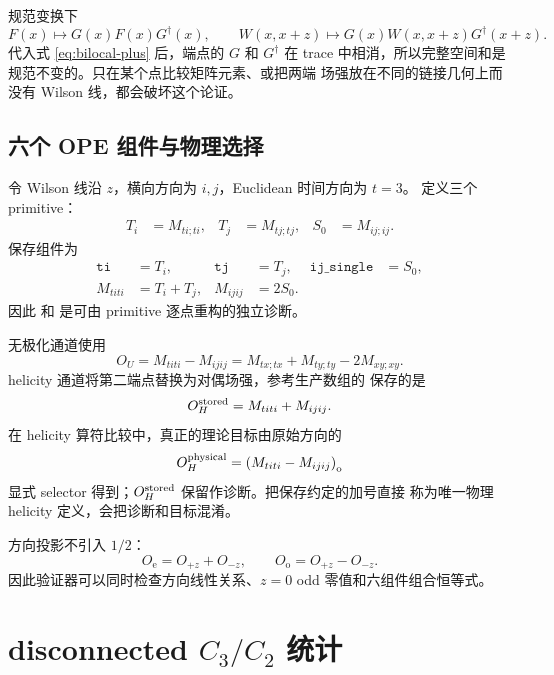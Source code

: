 \documentclass[UTF8,a4paper,11pt]{ctexart}
\newcommand{\code}[1]{\texttt{\detokenize{#1}}}
\newcommand{\odd}{\mathrm{o}}
\newcommand{\even}{\mathrm{e}}
\begin{document}
规范变换下
\begin{equation}
 F(x)\mapsto G(x)F(x)G^\dagger(x),\qquad
 W(x,x+z)\mapsto G(x)W(x,x+z)G^\dagger(x+z).
\label{eq:gauge-transform}
\end{equation}
代入式 \eqref{eq:bilocal-plus} 后，端点的 $G$ 和 $G^\dagger$ 在 trace
中相消，所以完整空间和是规范不变的。只在某个点比较矩阵元素、或把两端
场强放在不同的链接几何上而没有 Wilson 线，都会破坏这个论证。

\subsection{六个 OPE 组件与物理选择}

令 Wilson 线沿 $z$，横向方向为 $i,j$，Euclidean 时间方向为 $t=3$。
定义三个 primitive：
\begin{align}
 T_i&=M_{ti;ti},&
 T_j&=M_{tj;tj},&
 S_0&=M_{ij;ij}.
\end{align}
保存组件为
\begin{align}
 \texttt{ti}&=T_i,&
 \texttt{tj}&=T_j,&
 \texttt{ij\_single}&=S_0,\\
 M_{titi}&=T_i+T_j,&
 M_{ijij}&=2S_0.
\label{eq:components}
\end{align}
因此 \code{Mtiti} 和 \code{Mijij} 是可由 primitive 逐点重构的独立诊断。

无极化通道使用
\begin{equation}
 O_U=M_{titi}-M_{ijij}
 =M_{tx;tx}+M_{ty;ty}-2M_{xy;xy}.
\label{eq:unpol-combination}
\end{equation}
helicity 通道将第二端点替换为对偶场强，参考生产数组的
\code{combined} 保存的是
\begin{equation}
 O_H^{\rm stored}=M_{titi}+M_{ijij}.
\label{eq:hel-stored}
\end{equation}
在 helicity 算符比较中，真正的理论目标由原始方向的
\begin{equation}
 O_H^{\rm physical}
 =\left(M_{titi}-M_{ijij}\right)_{\odd}
\label{eq:hel-physical}
\end{equation}
显式 selector 得到；$O_H^{\rm stored}$ 保留作诊断。把保存约定的加号直接
称为唯一物理 helicity 定义，会把诊断和目标混淆。

方向投影不引入 $1/2$：
\begin{equation}
 O_{\even}=O_{+z}+O_{-z},\qquad
 O_{\odd}=O_{+z}-O_{-z}.
\label{eq:even-odd}
\end{equation}
因此验证器可以同时检查方向线性关系、$z=0$ odd 零值和六组件组合恒等式。

\section{disconnected $C_3/C_2$ 统计}
\end{document}
